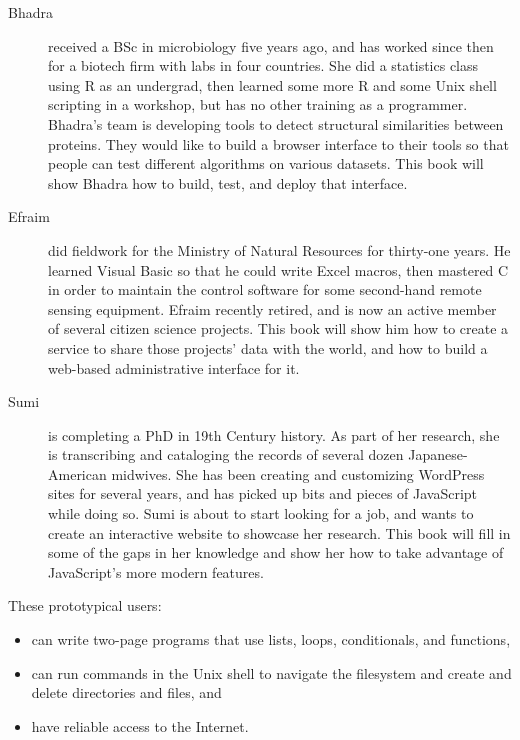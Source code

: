 \begin{description}

\item[Bhadra]
received a BSc in microbiology five years ago,
and has worked since then for a biotech firm with labs in four countries.
She did a statistics class using R as an undergrad,
then learned some more R and some Unix shell scripting
in a  workshop,
but has no other training as a programmer.
Bhadra's team is developing tools
to detect structural similarities between proteins.
They would like to build a browser interface to their tools
so that people can test different algorithms on various datasets.
This book will show Bhadra how to build, test, and deploy that interface.

\item[Efraim]
did fieldwork for the Ministry of Natural Resources for thirty-one years.
He learned Visual Basic so that he could write Excel macros,
then mastered C in order to maintain the control software
for some second-hand remote sensing equipment.
Efraim recently retired,
and is now an active member of several citizen science projects.
This book will show him how to create a service
to share those projects' data with the world,
and how to build a web-based administrative interface for it.

\item[Sumi]
is completing a PhD in 19th Century history.
As part of her research,
she is transcribing and cataloging the records of several dozen Japanese-American midwives.
She has been creating and customizing WordPress sites for several years,
and has picked up bits and pieces of JavaScript while doing so.
Sumi is about to start looking for a job,
and wants to create an interactive website to showcase her research.
This book will fill in some of the gaps in her knowledge
and show her how to take advantage of JavaScript's more modern features.

\end{description}

These prototypical users:

\begin{itemize}
\item
  can write two-page programs that use lists, loops, conditionals, and functions,
\item
  can run commands in the Unix shell to navigate the filesystem and create and delete directories and files, and
\item
  have reliable access to the Internet.
\end{itemize}

